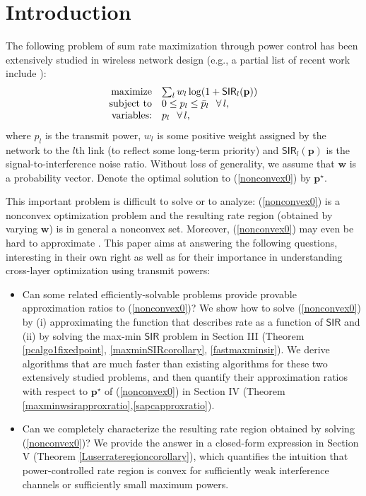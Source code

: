 \documentclass[10pt,twocolumn]{IEEEtran}
\newcommand{\0}{\mathbf{0}}
\newcommand{\1}{\mathbf{1}}
\begin{document}
\section{Introduction}
\label{sec:introduction}

The following problem of sum rate maximization through power control has been extensively studied in wireless network design (e.g., a partial list of recent work include \cite{Tan05,Chiang07,Kumaran06,Ebrahimi06,Gesbert07,Luo06,Charafeddine07,Chiang05,Luo08,Paschalidis07}): 
\begin{equation}
\label{nonconvex0}
\begin{array}
[c]{rl}
\mbox{maximize} & \sum_l w_l \log(1+\mathsf{SIR}_l(\mathbf{p}))\\
\mbox{subject to} & 0 \le p_l \le \bar{p}_l \,\;\; \forall \, l, \\
\mbox{variables:} & p_l \,\;\; \forall \, l,
\end{array}
\end{equation}
where $p_l$ is the transmit power, $w_l$ is some positive weight assigned by the network to the $l$th link (to reflect some long-term priority) and $\mathsf{SIR}_l(\mathbf{p})$ is the signal-to-interference noise ratio. Without loss of generality, we assume that $\mathbf{w}$ is a probability vector. Denote the optimal solution to (\ref{nonconvex0}) by $\mathbf{p}^{\star}$. 

This important problem is difficult to solve or to analyze: (\ref{nonconvex0}) is a nonconvex optimization problem and the resulting rate region (obtained by varying $\mathbf{w}$) is in general a nonconvex set. Moreover, (\ref{nonconvex0}) may even be hard to approximate \cite{Luo08}. This paper aims at answering the following questions, interesting in their own right as well as for their importance in understanding cross-layer optimization using transmit powers: 
\begin{itemize}
\item Can some related efficiently-solvable problems provide provable approximation ratios to (\ref{nonconvex0})? We show how to solve (\ref{nonconvex0}) by (i) approximating the function that describes rate as a function of $\mathsf{SIR}$ and (ii) by solving the max-min $\mathsf{SIR}$ problem in Section III (Theorem \ref{pcalgo1fixedpoint}, \ref{maxminSIRcorollary}, \ref{fastmaxminsir}). We derive algorithms that are much faster than existing algorithms for these two extensively studied problems, and then quantify their approximation ratios with respect to $\mathbf{p}^{\star}$ of (\ref{nonconvex0}) in Section IV (Theorem \ref{maxminwsirapproxratio},\ref{sapcapproxratio}). 

\item Can we completely characterize the resulting rate region obtained by solving (\ref{nonconvex0})? We provide the answer in a closed-form expression in Section V (Theorem \ref{Luserrateregioncorollary}), which quantifies the intuition that power-controlled rate region is convex for sufficiently weak interference channels or sufficiently small maximum powers.  
\end{itemize}
\end{document}
